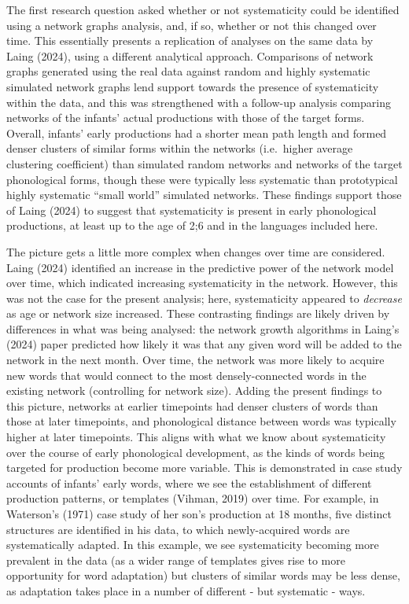 \documentclass[
  man]{apa6}
\begin{document}
The first research question asked whether or not systematicity could be identified using a network graphs analysis, and, if so, whether or not this changed over time. This essentially presents a replication of analyses on the same data by Laing (2024), using a different analytical approach. Comparisons of network graphs generated using the real data against random and highly systematic simulated network graphs lend support towards the presence of systematicity within the data, and this was strengthened with a follow-up analysis comparing networks of the infants' actual productions with those of the target forms. Overall, infants' early productions had a shorter mean path length and formed denser clusters of similar forms within the networks (i.e.~higher average clustering coefficient) than simulated random networks and networks of the target phonological forms, though these were typically less systematic than prototypical highly systematic ``small world'' simulated networks. These findings support those of Laing (2024) to suggest that systematicity is present in early phonological productions, at least up to the age of 2;6 and in the languages included here.

The picture gets a little more complex when changes over time are considered. Laing (2024) identified an increase in the predictive power of the network model over time, which indicated increasing systematicity in the network. However, this was not the case for the present analysis; here, systematicity appeared to \emph{decrease} as age or network size increased. These contrasting findings are likely driven by differences in what was being analysed: the network growth algorithms in Laing's (2024) paper predicted how likely it was that any given word will be added to the network in the next month. Over time, the network was more likely to acquire new words that would connect to the most densely-connected words in the existing network (controlling for network size). Adding the present findings to this picture, networks at earlier timepoints had denser clusters of words than those at later timepoints, and phonological distance between words was typically higher at later timepoints. This aligns with what we know about systematicity over the course of early phonological development, as the kinds of words being targeted for production become more variable. This is demonstrated in case study accounts of infants' early words, where we see the establishment of different production patterns, or templates (Vihman, 2019) over time. For example, in Waterson's (1971) case study of her son's production at 18 months, five distinct structures are identified in his data, to which newly-acquired words are systematically adapted. In this example, we see systematicity becoming more prevalent in the data (as a wider range of templates gives rise to more opportunity for word adaptation) but clusters of similar words may be less dense, as adaptation takes place in a number of different - but systematic - ways.
\end{document}
